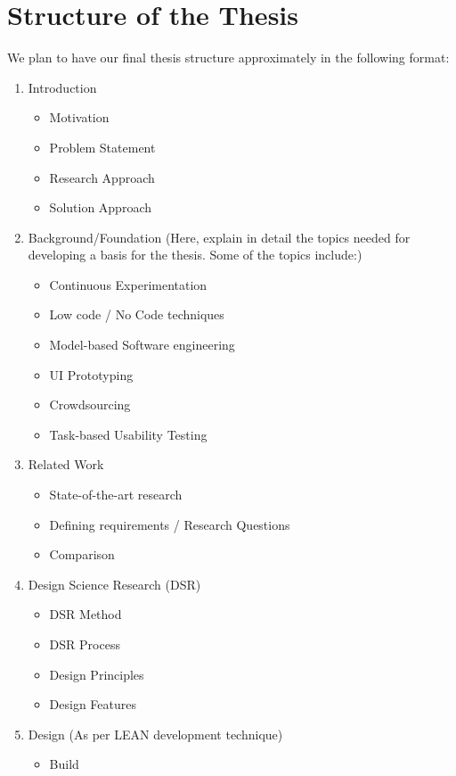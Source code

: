 \chapter{Structure of the Thesis} \label{sec:structure}

We plan to have our final thesis structure approximately in the following format: 

\begin{enumerate}
	\item Introduction
	\begin{itemize}
		\item Motivation
		\item Problem Statement
		\item Research Approach
		\item Solution Approach
	\end{itemize}
	\item Background/Foundation (Here, explain in detail the topics needed for developing a basis for the thesis. Some of the topics include:)
	\begin{itemize}
		\item Continuous Experimentation
		\item Low code / No Code techniques
		\item Model-based Software engineering
		\item UI Prototyping
		\item Crowdsourcing
		\item Task-based Usability Testing
	\end{itemize}
	\item Related Work
	\begin{itemize}
		\item State-of-the-art research
		\item Defining requirements / Research Questions
		\item Comparison
	\end{itemize}
	\item Design Science Research (DSR)
	\begin{itemize}
		\item DSR Method
		\item DSR Process
		\item Design Principles
		\item Design Features
	\end{itemize}
	\item Design (As per LEAN development technique)
	\begin{itemize}
		\item Build

\end{itemize}
\end{enumerate}

